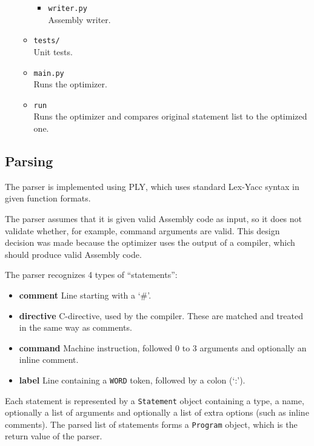 \documentclass[10pt,a4paper]{article}
\begin{document}
\begin{itemize}
\begin{itemize}
\begin{itemize}
        \item \texttt{writer.py} \\
            Assembly writer.
        \end{itemize}
    \item \texttt{tests/} \\
        Unit tests.
    \item \texttt{main.py} \\
        Runs the optimizer.
    \item \texttt{run} \\
        Runs the optimizer and compares original statement list to the
        optimized one.
    \end{itemize}
\end{itemize}

\subsection{Parsing}

The parser is implemented using PLY, which uses standard Lex-Yacc syntax in
given function formats.

The parser assumes that it is given valid Assembly code as input, so it does
not validate whether, for example, command arguments are valid. This design
decision was made because the optimizer uses the output of a compiler, which
should produce valid Assembly code.

The parser recognizes 4 types of ``statements'':
\begin{itemize}
    \item \textbf{comment} Line starting with a `\#'.
    \item \textbf{directive} C-directive, used by the compiler. These are
                             matched and treated in the same way as comments.
    \item \textbf{command} Machine instruction, followed 0 to 3 arguments and
                           optionally an inline comment.
    \item \textbf{label} Line containing a \texttt{WORD} token, followed by a
                         colon (`:').
\end{itemize}

Each statement is represented by a \texttt{Statement} object containing a type,
a name, optionally a list of arguments and optionally a list of extra options
(such as inline comments). The parsed list of statements forms a
\texttt{Program} object, which is the return value of the parser.
\end{document}
